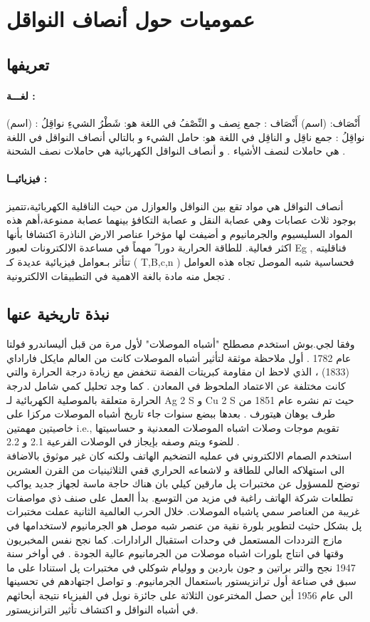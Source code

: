 \section{عموميات حول أنصاف النواقل}
\subsection{تعريفها }
\paragraph{لغـــة :}
أَنْصَاف: (اسم)
أَنْصَاف : جمع نِصف و النِّصْفُ في اللغة هو: شَطْرُ الشيءِ 
نواقِلُ : (اسم)
نواقِلُ : جمع ناقِل و الناقِل في اللغة هو: حامل الشيء
و بالتالي أنصاف النواقل في اللغة هي حاملات لنصف الأشياء .
و أنصاف النواقل الكهربائية هي حاملات نصف الشحنة .

\paragraph{فيزيائيــا :}
أنصاف النواقل هي مواد تقع بين النواقل والعوازل من حيث الناقلية الكهربائية،تتميز بوجود ثلاث عصابات وهي عصابة النقل و عصابة التكافؤ بينهما عصابة ممنوعة،أهم هذه المواد السليسيوم والجرمانيوم و أضيفت لها مؤخرا عناصر الارض الناذرة اكتشافا بأنها اكثر فعالية. للطاقة الحرارية دورا ً مهماً في مساعدة الالكترونات لعبور Eg , فناقليته تتأثر بـعوامل فيزيائية عديدة كـ ( T,B,c,n ) فحساسية شبه الموصل تجاه هذه العوامل تجعل منه مادة بالغة الاهمية في التطبيقات الالكترونية .
\subsection{نبذة تاريخية عنها }

وفقا لجي.بوش   استخدم مصطلح "أشباه الموصلات" لأول مرة من قبل أليساندرو فولتا عام 1782 .
أول ملاحظة موثقة لتأثير أشباه الموصلات كانت من العالم مايكل فاراداي (1833) ، الذي لاحظ ان مقاومة كبريتات الفضة تنخفض مع زيادة درجة الحرارة  والتي كانت مختلفة عن الاعتماد  الملحوظ في المعادن .
كما وجد تحليل كمي شامل لدرجة الحرارة متعلقة بالموصلية الكهربائية لـ Ag 2 S و Cu 2 S حيث تم نشره عام 1851 من طرف يوهان هيتورف . بعدها ببضع سنوات جاء تاريخ أشباه الموصلات مركزا على خاصيتين مهمتين i.e., تقويم موجات وصلات اشباه الموصلات المعدنية و حساسيتها للضوء ويتم وصفه بإيجاز في الوصلات الفرعية 2.1 و 2.2 .\\
استخدم الصمام الالكتروني في عمليه التضخيم الهاتف ولكنه كان غير موثوق بالاضافة الى استهلاكه العالي للطاقة و لاشعاعه الحراري قفي الثلاثينيات من القرن العشرين توضح للمسؤول عن مختبرات پل مارقين كيلي بان هناك حاجة ماسة لجهاز جديد يواكب تطلعات شركة الهاتف راغبة في مزيد من التوسع. بدأ العمل على صنف ذي مواصفات غريبة من العناصر سمي پاشباه الموصلات. خلال الحرب العالمية الثانية عملت مختبرات پل بشكل حثيث لتطوير بلورة نقية من عنصر شبه موصل هو الجرمانيوم لاستخدامها في مازج الترددات المستعمل في وحدات استقبال الرادارات. كما نجح نفس المخبريون وقتها في انتاج بلورات اشباه موصلات من الجرمانيوم عالية الجودة .
في أواخر سنة 1947 نجح والتر براتين و جون باردين و ووليام شوكلي في مختبرات پل استنادا على ما سبق في صناعة أول ترانزيستور باستعمال الجرمانيوم.
و تواصل اجتهادهم في تحسينها الى عام 1956 أين حصل المخترعون الثلاثة على جائزة نوبل في الفيزياء نتيجة أبحاثهم في أشباه النواقل و اكتشاف تأثير الترانزيستور.

